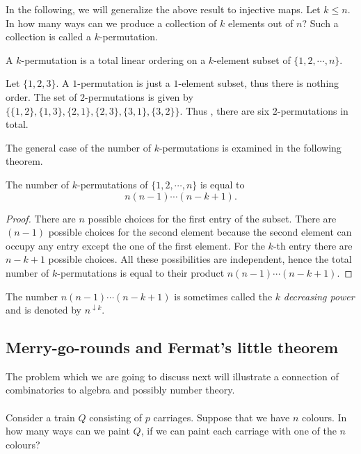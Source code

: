 In the following, we will generalize the above result to injective maps. Let $k \leq n$. In how many ways can we produce a collection 
of $k$ elements out of $n$? Such a collection is called a $k$-permutation.

\begin{defn}[$k$-permutation]
A $k$-permutation is a total linear ordering on a $k$-element subset of $\{1, 2, \cdots, n\}$.
\end{defn}

\begin{exmp}
Let $\{1,2 ,3\}$. A $1$-permutation is just a $1$-element subset, thus there is nothing order. The set of 
$2$-permutations is given by $\{\{1,2\}, \{1,3\}, \{2,1\}, \{2,3\}, \{3,1\}, \{3,2\}\}$.
Thus , there are six $2$-permutations in total.
\end{exmp}

\newpage

The general case of the number of $k$-permutations is examined in the following theorem.

\begin{theorem}
The number of $k$-permutations of $\{1,2, \cdots, n\}$ is equal to $$n(n-1)\cdots (n-k+1).$$
\end{theorem}

\begin{proof}
There are $n$ possible choices for the first entry of the subset. There are $(n-1)$ possible choices for the second element because the second element can occupy any entry except the one of the first element. 
For the $k$-th entry there are $n-k+1$ possible choices. All these possibilities are independent, hence
the total number of $k$-permutations is equal to their product $n(n-1)\cdots (n-k+1)$.
\end{proof}

The number $n(n-1)\cdots (n-k+1)$ is sometimes called the $k$ \textit{decreasing power} and is denoted by $n^{\downarrow k}$.

\subsection{Merry-go-rounds and Fermat's little theorem}
The problem which we are going to discuss next will illustrate a connection of combinatorics to algebra and possibly number theory.
\\
\\
Consider a train $Q$ consisting of $p$ carriages. Suppose that we have $n$ colours. In how many ways can we paint $Q$, if we can paint 
each carriage with one of the $n$ colours? 


